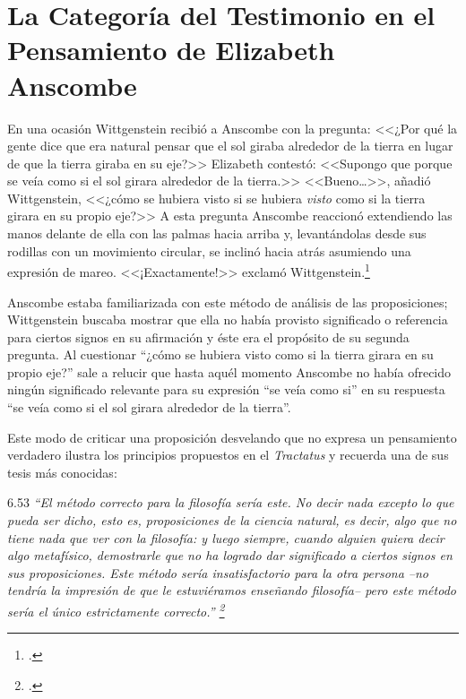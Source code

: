 \documentclass[../main.tex]{subfiles}
\begin{document}
\chapter*{La Categoría del Testimonio en el Pensamiento de Elizabeth Anscombe}


En una ocasión Wittgenstein recibió a Anscombe con la pregunta: <<¿Por qué la gente dice que era natural pensar que el sol giraba alrededor de la tierra en lugar de que la tierra giraba en su eje?>> Elizabeth contestó: <<Supongo que porque se veía como si el sol girara alrededor de la tierra.>> <<Bueno\ldots>>, añadió Wittgenstein, <<¿cómo se hubiera visto si se hubiera \emph{visto} como si la tierra girara en su propio eje?>> A esta pregunta Anscombe reaccionó extendiendo las manos delante de ella con las palmas hacia arriba y, levantándolas desde sus rodillas con un movimiento circular, se inclinó hacia atrás asumiendo una expresión de mareo. <<¡Exactamente!>> exclamó Wittgenstein.\footcite[151]{IWT}

Anscombe estaba familiarizada con este método de análisis de las proposiciones; Wittgenstein buscaba mostrar que ella no había provisto significado o referencia para ciertos signos en su afirmación y éste era el propósito de su segunda pregunta. Al cuestionar ``¿cómo se hubiera visto como si la tierra girara en su propio eje?'' sale a relucir que hasta aquél momento Anscombe no había ofrecido ningún significado relevante para su expresión ``se veía como si'' en su respuesta ``se veía como si el sol girara alrededor de la tierra''. 

Este modo de criticar una proposición desvelando que no expresa un pensamiento verdadero ilustra los principios propuestos en el \emph{Tractatus} y recuerda una de sus tesis más conocidas: 

6.53 \emph{``El método correcto para la filosofía sería este. No decir nada excepto lo que pueda ser dicho, esto es, proposiciones de la ciencia natural, es decir, algo que no tiene nada que ver con la filosofía: y luego siempre, cuando alguien quiera decir algo metafísico, demostrarle que no ha logrado dar significado a ciertos signos en sus proposiciones. Este método sería insatisfactorio para la otra persona --no tendría la impresión de que le estuviéramos enseñando filosofía-- pero este método sería el único estrictamente correcto.'' \footcite[p. 107--108]{tractatus}}
\end{document}
